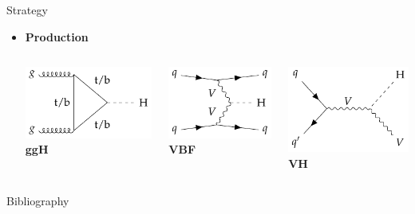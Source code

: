 \documentclass[9pt,aspectratio=1610]{beamer}
\newcommand{\hl}[1]{\textbf{\color{structure}#1}}
\begin{document}
\begin{frame}{Strategy}
	\begin{itemize}
		\item \hl{Production}
		\vspace{1em}
		\begin{columns}
			\centering
			\begin{column}{0.31\textwidth}
				\centering
				\includegraphics[height=0.25\textheight]{feynman-diagrams/ggH.pdf}\\
				\textbf{ggH}
			\end{column}
			\begin{column}{0.31\textwidth}
				\centering
				\includegraphics[height=0.25\textheight]{feynman-diagrams/VBF.pdf}\\
				\textbf{VBF}
			\end{column}
			\begin{column}{0.31\textwidth}
				\centering
				\includegraphics[height=0.25\textheight]{feynman-diagrams/VH.pdf}\\
				\textbf{VH}
			\end{column}
		\end{columns}
	\end{itemize}
\end{frame}

\begin{frame}{Bibliography}
	\scriptsize
	
	
\end{frame}
\end{document}

